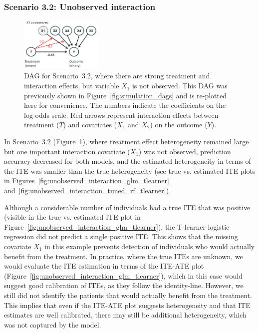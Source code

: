 \clearpage



\subsubsection{Scenario 3.2: Unobserved interaction} \label{sec:exp3_sc2}

\begin{figure}[htbp]
\centering
\includegraphics[width=0.35\textwidth]{img/results_ITE_simulation/simulation_unobserved.png}
\caption{DAG for Scenario~3.2, where there are strong treatment and interaction effects, but variable $X_1$ is not observed. This DAG was previously shown in Figure~\ref{fig:simulation_dags} and is re-plotted here for convenience. The numbers indicate the coefficients on the log-odds scale. Red arrows represent interaction effects between treatment ($T$) and covariates ($X_1$ and $X_2$) on the outcome ($Y$).}
\label{fig:unobserved_interaction_dag}
\end{figure}


In Scenario~3.2 (Figure~\ref{fig:unobserved_interaction_dag}), where treatment effect heterogeneity remained large but one important interaction covariate ($X_1$) was not observed, prediction accuracy decreased for both models, and the estimated heterogeneity in terms of the ITE was smaller than the true heterogeneity (see true vs. estimated ITE plots in Figures~\ref{fig:unobserved_interaction_glm_tlearner} and~\ref{fig:unobserved_interaction_tuned_rf_tlearner}). 

Although a considerable number of individuals had a true ITE that was positive (visible in the true vs. estimated ITE plot in Figure~\ref{fig:unobserved_interaction_glm_tlearner}), the T-learner logistic regression did not predict a single positive ITE. This shows that the missing covariate $X_1$ in this example prevents detection of individuals who would actually benefit from the treatment. In practice, where the true ITEs are unknown, we would evaluate the ITE estimation in terms of the ITE-ATE plot (Figure~\ref{fig:unobserved_interaction_glm_tlearner}), which in this case would suggest good calibration of ITEs, as they follow the identity-line. However, we still did not identify the patients that would actually benefit from the treatment. This implies that even if the ITE-ATE plot suggests heterogeneity and that ITE estimates are well calibrated, there may still be additional heterogeneity, which was not captured by the model.






